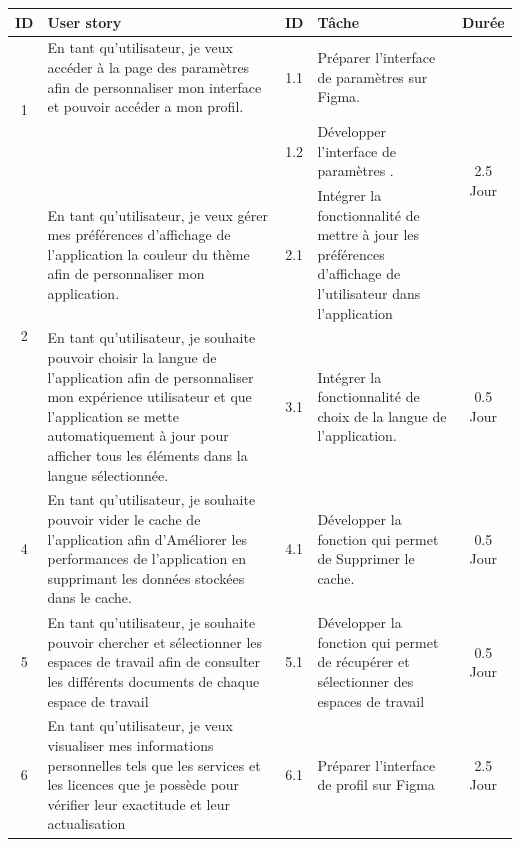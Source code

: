 \begin{adjustwidth}{-1cm}{}
    
    \begin{longtable}{|c|p{6cm}|c|p{6cm}|c|}
      \hline
      \textbf{ID} & \textbf{User story} & \textbf{ID}  & \textbf{Tâche} & \textbf{Durée} \\
      \hline
      \multirow{2}{*}{1} & En tant qu'utilisateur, je veux accéder à la page des paramètres afin de personnaliser mon interface et pouvoir accéder a mon profil.
      & 1.1 & Préparer l'interface de paramètres sur Figma. & \multirow{3}{*}{2.5 Jour} \\
      \cline{3-4}
      & & 1.2 & Développer l'interface de paramètres	. & \\
      \cline{1-5}
      \multirow{2}{*}{2} & En tant qu'utilisateur, je veux gérer mes préférences d'aﬀichage de l'application la couleur du thème afin de personnaliser mon application.&2.1&Intégrer la fonctionnalité de mettre à jour les préférences d'affichage de l'utilisateur dans l'application &  \multirow{3}{*}{2.5 Jour} \\
      \cline{1-5}
      \multirow{1}{*}{3} & En tant qu'utilisateur, je souhaite pouvoir choisir la langue de l'application afin de personnaliser mon expérience utilisateur et que l'application se mette automatiquement à jour pour afficher tous les éléments dans la langue sélectionnée. & 3.1 &Intégrer la fonctionnalité de choix de la langue de l'application. & \multirow{1}{*}{0.5 Jour} \\
      \cline{1-5}
      \multirow{1}{*}{4} & En tant qu'utilisateur, je souhaite pouvoir vider le cache de l'application afin d'Améliorer les performances de l'application en supprimant les données stockées dans le cache. & 4.1 &Développer la fonction qui permet de Supprimer le cache. & \multirow{1}{*}{0.5 Jour} \\
      \cline{1-5}
      \multirow{1}{*}{5} & En tant qu'utilisateur, je souhaite pouvoir chercher et sélectionner les espaces de travail afin de consulter les différents documents de chaque espace de travail & 5.1 & Développer la fonction qui permet de récupérer et sélectionner des espaces de travail & \multirow{1}{*}{0.5 Jour} \\
      \cline{1-5}
      \multirow{3}{*}{6} & En tant qu'utilisateur, je veux visualiser mes informations personnelles tels que les services et les licences que je possède pour vérifier leur exactitude et leur actualisation & 6.1 & Préparer l'interface de profil sur Figma & \multirow{3}{*}{2.5 Jour} \\

\end{longtable}
\end{adjustwidth}
